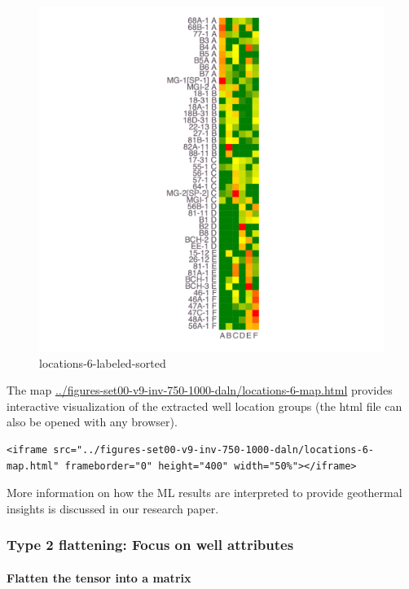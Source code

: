 \documentclass[11pt]{article}
\begin{document}
\begin{figure}
\centering
\includegraphics{../figures-set00-v9-inv-750-1000-daln/locations-6-labeled-sorted.png}
\caption{locations-6-labeled-sorted}
\end{figure}

The map \url{../figures-set00-v9-inv-750-1000-daln/locations-6-map.html}
provides interactive visualization of the extracted well location groups
(the html file can also be opened with any browser).

\begin{verbatim}
<iframe src="../figures-set00-v9-inv-750-1000-daln/locations-6-map.html" frameborder="0" height="400" width="50%"></iframe>
\end{verbatim}

More information on how the ML results are interpreted to provide
geothermal insights is discussed in our research paper.

    \hypertarget{type-2-flattening-focus-on-well-attributes}{%
\subsubsection{Type 2 flattening: Focus on well
attributes}\label{type-2-flattening-focus-on-well-attributes}}

\hypertarget{flatten-the-tensor-into-a-matrix}{%
\paragraph{Flatten the tensor into a
matrix}\label{flatten-the-tensor-into-a-matrix}}
\end{document}
